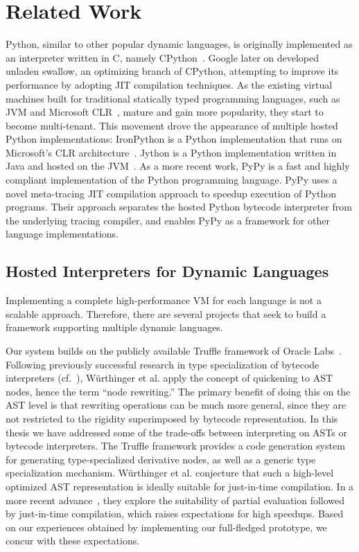 \chapter{Related Work}
\label{chp:ch8-related-work}

Python, similar to other popular dynamic languages, is originally implemented as an interpreter written in C, namely CPython~\cite{python}.
Google later on developed unladen swallow, an optimizing branch of CPython, attempting to improve its performance by adopting JIT compilation techniques.
As the existing virtual machines built for traditional statically typed programming languages, such as JVM and Microsoft CLR~\cite{Kennedy+2001,Gough+2001,kilgore2002open}, mature and gain more popularity, they start to become multi-tenant.
This movement drove the appearance of multiple hosted Python implementations:
IronPython is a Python implementation that runs on Microsoft's CLR architecture~\cite{hugunin2004ironpython}.
Jython is a Python implementation written in Java and hosted on the JVM~\cite{jython}.
As a more recent work, PyPy\cite{Rigo2006,bolz.etal09,Bolz+2011,Bolz+alloc+2011,Bolz+2013,bolz.etal+15,Ardo+2012,Schneider+2012} is a fast and highly compliant implementation of the Python programming language.
PyPy uses a novel meta-tracing JIT compilation approach to speedup execution of Python programs.
Their approach separates the hosted Python bytecode interpreter from the underlying tracing compiler, and enables PyPy as a framework for other language implementations.

\section{Hosted Interpreters for Dynamic Languages}

Implementing a complete high-performance VM for each language is not a scalable approach.
Therefore, there are several projects that seek to build a framework supporting multiple dynamic languages.

Our system builds on the publicly available Truffle framework of Oracle Labs~\cite{Wurthinger+12}.
Following previously successful research in type specialization of bytecode interpreters (cf.~\cite{Brunthaler2010inca,Brunthaler2010quickening,williams.etal+10}), W\"{u}rthinger et al. apply the concept of quickening to AST nodes, hence the term ``node rewriting.''
The primary benefit of doing this on the AST level is that rewriting operations can be much more general, since they are not restricted to the rigidity superimposed by bytecode representation.
In this thesis we have addressed some of the trade-offs between interpreting on ASTs or bytecode interpreters.
The Truffle framework provides a code generation system for generating type-specialized derivative nodes, as well as a generic type specialization mechanism.
W\"{u}rthinger et al. conjecture that such a high-level optimized AST representation is ideally suitable for just-in-time compilation.
In a more recent advance~\cite{Wurthinger+13}, they explore the suitability of partial evaluation followed by just-in-time compilation, which raises expectations for high speedups.
Based on our experiences obtained by implementing our full-fledged prototype, we concur with these expectations.

